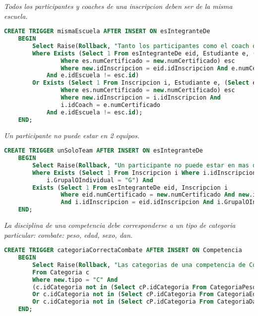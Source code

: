 \emph{Todos los participantes y coaches de una inscripcion deben ser de la misma escuela.}

\begin{lstlisting}[language=SQL]
CREATE TRIGGER mismaEscuela AFTER INSERT ON esIntegranteDe
    BEGIN
        Select Raise(Rollback, "Tanto los participantes como el coach deben ser de la misma escuela.")
        Where Exists (Select 1 From esIntegranteDe eid, Estudiante e, (Select es.idEscuela id From Estudiante es
                Where es.numCertificado = new.numCertificado) esc
                Where new.idInscripcion = eid.idInscripcion And e.numCertificado = eid.numCertificado
            And e.idEscuela != esc.id)
        Or Exists (Select 1 From Inscripcion i, Estudiante e, (Select es.idEscuela id From Estudiante es
                Where es.numCertificado = new.numCertificado) esc
                Where new.idInscripcion = i.idInscripcion And 
                i.idCoach = e.numCertificado
            And e.idEscuela != esc.id);
    END;
\end{lstlisting}

\emph{Un participante no puede estar en 2 equipos.}

\begin{lstlisting}[language=SQL]
CREATE TRIGGER unSoloTeam AFTER INSERT ON esIntegranteDe
    BEGIN
        Select Raise(Rollback, "Un participante no puede estar en mas de un equipo.")
        Where Exists (Select 1 From Inscripcion i Where i.idInscripcion = new.idInscripcion And 
            i.GrupalOIndividual = "G") And 
        Exists (Select 1 From esIntegranteDe eid, Inscripcion i 
                Where eid.numCertificado = new.numCertificado And new.idInscripcion != eid.idInscripcion
                And i.idInscripcion = eid.idInscripcion And i.GrupalOIndividual = "G");
    END;
\end{lstlisting}
  
\emph{
  La disciplina de una competencia debe corresponderse a un tipo de categoria particular: combate: peso, edad, sexo, dan.
}

\begin{lstlisting}[language=SQL]
CREATE TRIGGER categoriaCorrectaCombate AFTER INSERT ON Competencia
    BEGIN
        Select Raise(Rollback, "Las categorias de una competencia de Combate deben ser: Peso, Edad, Genero y Graduacion.")
        From Categoria c
        Where new.tipo = "C" And
        (c.idCategoria not in (Select cP.idCategoria From CategoriaPeso cP)
        Or c.idCategoria not in (Select cP.idCategoria From CategoriaEdad cP)
        Or c.idCategoria not in (Select cP.idCategoria From CategoriaDan cP));
    END;
\end{lstlisting}
  

